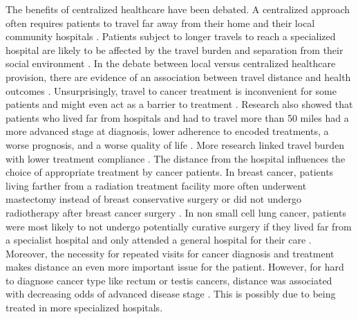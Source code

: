 The benefits of centralized healthcare have been debated. A centralized approach
often requires patients to travel far away from their home and their local
community hospitals \cite{woo_centralisation_2012}. Patients subject to longer
travels to reach a specialized hospital are likely to be affected by the travel
burden and separation from their social environment \cite{payne_impact_2000}. In
the debate between local versus centralized healthcare provision, there are
evidence of an association between travel distance and health outcomes
\cite{kelly_are_2016}. Unsurprisingly, travel to cancer treatment is
inconvenient for some patients and might even act as a barrier to treatment
\cite{payne_impact_2000}. Research also showed that patients who lived far from
hospitals and had to travel more than 50 miles had a more advanced stage at
diagnosis, lower adherence to encoded treatments, a worse prognosis, and a worse
quality of life \cite{ambroggi_distance_2015}. More research linked travel
burden with lower treatment compliance
\cite{dutta_evaluation_2013,guidry_transportation_1997}. The distance from the
hospital influences the choice of appropriate treatment by cancer patients. In
breast cancer, patients living farther from a radiation treatment facility more
often underwent mastectomy instead of breast conservative surgery
\cite{schroen_impact_2005,celaya_travel_2006,voti_treatment_2006,meden_relationship_2002,nattinger_relationship_2001,boscoe_geographic_2011}
or did not undergo radiotherapy after breast cancer surgery
\cite{satasivam_dilemma_2014,schroen_impact_2005,celaya_travel_2006}. In non
small cell lung cancer, patients were most likely to not undergo potentially
curative surgery if they lived far from a specialist hospital and only attended
a general hospital for their care \cite{tracey_patients_2015}. Moreover, the
necessity for repeated visits for cancer diagnosis and treatment makes distance
an even more important issue for the patient\cite{guidry_transportation_1997}.
However, for hard to diagnose cancer type like rectum or testis cancers,
distance was associated with decreasing odds of advanced disease stage
\cite{virgilsen_travel_2019}. This is possibly due to being treated in more
specialized hospitals.

